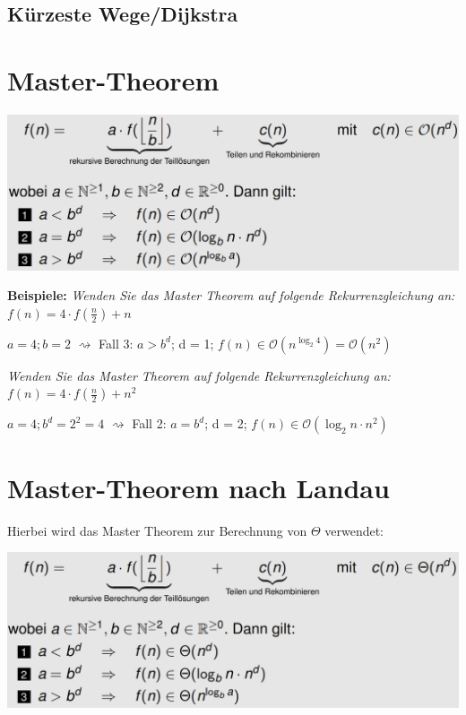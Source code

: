 \documentclass[12pt,a4paper]{article}
\begin{document}
\subsection{Kürzeste Wege/Dijkstra}


\section{Master-Theorem}
\begin{center}
	\includegraphics[scale=.8]{Bilder/MasterTheorem.PNG}
\end{center}
\textbf{Beispiele:}\newline
\textit{Wenden Sie das Master Theorem auf folgende Rekurrenzgleichung an:} $f(n)= 4\cdot f(\frac{n}{2}) +  n$\newline
\begin{center}
	$a = 4; b = 2$ $\rightsquigarrow $ Fall 3: $a>b^d$; d = 1;\newline
	$f(n) \in \mathcal{O}(n^{\log_2 4}) = \mathcal{O}(n^2)$
\end{center}
\vspace{.8cm}
\textit{Wenden Sie das Master Theorem auf folgende Rekurrenzgleichung an:} $f(n)= 4\cdot f(\frac{n}{2}) +  n^2$\newline
\begin{center}
	$a = 4; b^d = 2^2 = 4$ $\rightsquigarrow $ Fall 2: $a=b^d$; d = 2;\newline
	$f(n) \in \mathcal{O}(\log_2 n \cdot n^2)$
\end{center}

\section{Master-Theorem nach Landau}
\label{sec:MasterLandau}
Hierbei wird das Master Theorem zur Berechnung von $\Theta $ verwendet:\newline
\begin{center}
	\includegraphics[scale=.8]{Bilder/MasterTheoremLandau.PNG}
\end{center}
\end{document}
